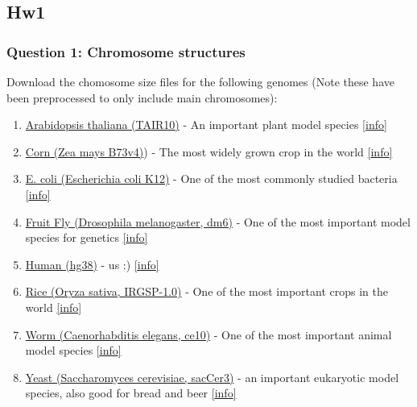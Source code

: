 \documentclass[]{article}
\title{}
\author{}
\date{}
\providecommand{\tightlist}{%
  \setlength{\itemsep}{0pt}\setlength{\parskip}{0pt}}
\begin{document}
\subsection{Hw1}\label{hw1}

\subsubsection{Question 1: Chromosome
structures}\label{question-1-chromosome-structures}

Download the chomosome size files for the following genomes (Note these
have been preprocessed to only include main chromosomes):

\begin{enumerate}
\def\labelenumi{\arabic{enumi}.}
\tightlist
\item
  \href{http://schatz-lab.org/appliedgenomics2019/assignments/assignment1/TAIR10.chrom.sizes}{Arabidopsis
  thaliana (TAIR10)} - An important plant model species
  \href{https://en.wikipedia.org/wiki/Arabidopsis_thaliana}{{[}info{]}}
\item
  \href{http://schatz-lab.org/appliedgenomics2019/assignments/assignment1/zm4.chrom.sizes}{Corn
  (Zea mays B73v4)}) - The most widely grown crop in the world
  \href{https://en.wikipedia.org/wiki/Maize}{{[}info{]}}
\item
  \href{http://schatz-lab.org/appliedgenomics2019/assignments/assignment1/ecoli.chrom.sizes}{E.
  coli (Escherichia coli K12)} - One of the most commonly studied
  bacteria
  \href{https://en.wikipedia.org/wiki/Escherichia_coli}{{[}info{]}}
\item
  \href{http://schatz-lab.org/appliedgenomics2019/assignments/assignment1/dm6.chrom.sizes}{Fruit
  Fly (Drosophila melanogaster, dm6)} - One of the most important model
  species for genetics
  \href{https://en.wikipedia.org/wiki/Drosophila_melanogaster}{{[}info{]}}
\item
  \href{http://schatz-lab.org/appliedgenomics2019/assignments/assignment1/hg38.chrom.sizes}{Human
  (hg38)} - us :)
  \href{https://en.wikipedia.org/wiki/Homo_sapiens}{{[}info{]}}
\item
  \href{http://schatz-lab.org/appliedgenomics2019/assignments/assignment1/rice.chrom.sizes}{Rice
  (Oryza sativa, IRGSP-1.0)} - One of the most important crops in the
  world \href{https://en.wikipedia.org/wiki/Rice}{{[}info{]}}
\item
  \href{http://schatz-lab.org/appliedgenomics2019/assignments/assignment1/ce10.chrom.sizes}{Worm
  (Caenorhabditis elegans, ce10)} - One of the most important animal
  model species
  \href{https://en.wikipedia.org/wiki/Caenorhabditis_elegans}{{[}info{]}}
\item
  \href{http://schatz-lab.org/appliedgenomics2019/assignments/assignment1/yeast.chrom.sizes}{Yeast
  (Saccharomyces cerevisiae, sacCer3)} - an important eukaryotic model
  species, also good for bread and beer
  \href{https://en.wikipedia.org/wiki/Saccharomyces_cerevisiae}{{[}info{]}}
\end{enumerate}
\end{document}
